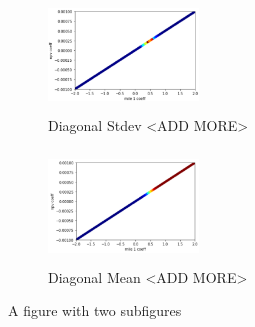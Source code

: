\begin{figure}
\begin{subfigure}{.25\textwidth}
  \includegraphics[height=3cm,width=4cm]{AAMAS20Template-submission/figures/rapp100diagstdev.png}
    \caption{Diagonal Stdev <ADD MORE>}
  \label{fig:sub1}
\end{subfigure}%
\begin{subfigure}{.25\textwidth}
  \includegraphics[height=3cm,width=4cm]{AAMAS20Template-submission/figures/rapp100diagmean.png}
  \caption{Diagonal Mean <ADD MORE>}
  \label{fig:sub2}
\end{subfigure}
\caption{A figure with two subfigures}
\label{fig:test}
\end{figure}

